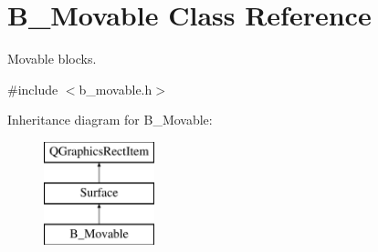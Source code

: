 \hypertarget{class_b___movable}{}\section{B\+\_\+\+Movable Class Reference}
\label{class_b___movable}


Movable blocks.  




{\ttfamily \#include $<$b\+\_\+movable.\+h$>$}

Inheritance diagram for B\+\_\+\+Movable\+:\begin{figure}[H]
\begin{center}
\leavevmode
\includegraphics[height=3.000000cm]{class_b___movable}
\end{center}
\end{figure}
